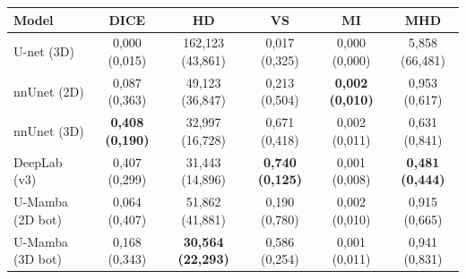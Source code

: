 \begin{tabular}{l c c c c c}
 \hline
Model & DICE & HD & VS & MI & MHD \\ \hline
U-net (3D) & 0,000 (0,015) & 162,123 (43,861) & 0,017 (0,325) & 0,000 (0,000) & 5,858 (66,481) \\ 
nnUnet (2D) & 0,087 (0,363) & 49,123 (36,847) & 0,213 (0,504) & \textbf{0,002 (0,010)} & 0,953 (0,617) \\ 
nnUnet (3D) & \textbf{0,408 (0,190)} & 32,997 (16,728) & 0,671 (0,418) & 0,002 (0,011) & 0,631 (0,841) \\ 
DeepLab (v3) & 0,407 (0,299) & 31,443 (14,896) & \textbf{0,740 (0,125)} & 0,001 (0,008) & \textbf{0,481 (0,444)} \\ 
U-Mamba (2D bot) & 0,064 (0,407) & 51,862 (41,881) & 0,190 (0,780) & 0,002 (0,010) & 0,915 (0,665) \\ 
U-Mamba (3D bot) & 0,168 (0,343) & \textbf{30,564 (22,293)} & 0,586 (0,254) & 0,001 (0,011) & 0,941 (0,831) \\ 
\hline 
 \end{tabular}
